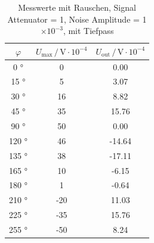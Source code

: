 \begin{table}[!h]
  \centering
  \begin{tabular}{S[table-format=4.0]SS}
    \toprule
    {$\varphi$} &
    {$U_\text{max} \,/\, \si{\volt}\cdot10^{-4}$} &
    {$U_\text{out} \,/\, \si{\volt}\cdot10^{-4}$} \\
       \si{\degree}  &    0     &      0.00 \\
   15   \si{\degree}  &    5     &      3.07 \\
   30   \si{\degree}  &    16    &      8.82 \\
   45   \si{\degree}  &    35    &     15.76 \\
   90   \si{\degree}  &    50    &      0.00 \\
  120   \si{\degree}  &    46    &    -14.64 \\
  135   \si{\degree}  &    38    &    -17.11 \\
  165   \si{\degree}  &    10    &     -6.15 \\
  180   \si{\degree}  &    1     &     -0.64 \\
  210   \si{\degree}  &    -20   &     11.03 \\
  225   \si{\degree}  &    -35   &     15.76 \\
  255   \si{\degree}  &    -50   &      8.24 \\
    \bottomrule
  \end{tabular}
  \caption{Messwerte mit Rauschen, Signal Attenuator = 1,
          Noise Amplitude = 1$\times 10^{-3}$, mit Tiefpass}
  \label{tab:d}
\quad
\hfill
\end{table}

